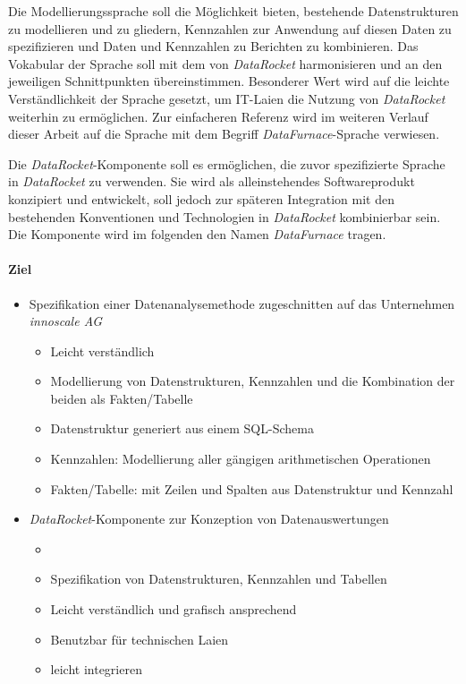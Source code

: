 \documentclass[
  language=german, %
  type=bachelor%
]{isthesis}
\begin{document}
\begin{content}
  Die Modellierungssprache soll die Möglichkeit bieten, bestehende
  Datenstrukturen zu modellieren und zu gliedern, Kennzahlen zur Anwendung auf
  diesen Daten zu spezifizieren und Daten und Kennzahlen zu Berichten zu
  kombinieren. Das Vokabular der Sprache soll mit dem von \textit{DataRocket}
  harmonisieren und an den jeweiligen Schnittpunkten übereinstimmen. Besonderer
  Wert wird auf die leichte Verständlichkeit der Sprache gesetzt, um IT-Laien
  die Nutzung von \textit{DataRocket} weiterhin zu ermöglichen. Zur
  einfacheren Referenz wird im weiteren Verlauf dieser Arbeit auf die Sprache
  mit dem Begriff \textit{DataFurnace}-Sprache verwiesen.
  
  Die \textit{DataRocket}-Komponente soll es ermöglichen, die zuvor
  spezifizierte Sprache in \textit{DataRocket} zu verwenden. Sie wird als
  alleinstehendes Softwareprodukt konzipiert und entwickelt, soll jedoch zur
  späteren Integration mit den bestehenden Konventionen und Technologien in
  \textit{DataRocket} kombinierbar sein. Die Komponente wird im folgenden den
  Namen \textit{DataFurnace} tragen.


  \paragraph{Ziel}
  \begin{itemize}
    \item Spezifikation einer Datenanalysemethode zugeschnitten auf das
      Unternehmen \textit{innoscale AG}
      \begin{itemize}
        \item Leicht verständlich
        \item Modellierung von Datenstrukturen, Kennzahlen und die Kombination der
          beiden als Fakten/Tabelle
        \item Datenstruktur generiert aus einem SQL-Schema
        \item Kennzahlen: Modellierung aller gängigen arithmetischen Operationen
        \item Fakten/Tabelle: mit Zeilen und Spalten aus Datenstruktur und Kennzahl 
      \end{itemize}
    \item \textit{DataRocket}-Komponente zur Konzeption von Datenauswertungen
      \begin{itemize}
        \item {}
        \item Spezifikation von Datenstrukturen, Kennzahlen und Tabellen
        \item Leicht verständlich und grafisch ansprechend
        \item Benutzbar für technischen Laien
        \item leicht integrieren
      \end{itemize}
  \end{itemize}


\end{content}
\end{document}
